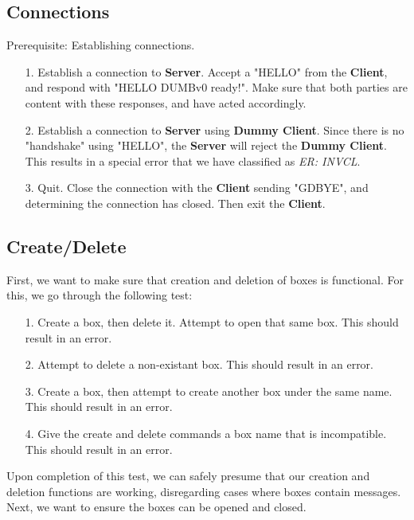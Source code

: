\documentclass{article}
\begin{document}
        \subsection{Connections}
            Prerequisite: Establishing connections.
            \begin{itemize}
                \item[1.] Establish a connection to \textbf{Server}. Accept a "HELLO" from the \textbf{Client}, and respond with "HELLO DUMBv0 ready!". Make sure that both parties are content with these responses, and have acted accordingly.
                \item[2.] Establish a connection to \textbf{Server} using \textbf{Dummy Client}. Since there is no "handshake" using "HELLO", the \textbf{Server} will reject the \textbf{Dummy Client}. This results in a special error that we have classified as \textit{ER: INVCL}.
                \item[3.] Quit. Close the connection with the \textbf{Client} sending "GDBYE", and determining the connection has closed. Then exit the \textbf{Client}.
            \end{itemize}
        \subsection{Create/Delete}
            First, we want to make sure that creation and deletion of boxes is functional. For this, we go through the following test:
            \begin{itemize}
                \item[1.] Create a box, then delete it. Attempt to open that same box. This should result in an error.
                \item[2.] Attempt to delete a non-existant box. This should result in an error.
                \item[3.] Create a box, then attempt to create another box under the same name. This should result in an error.
                \item[4.] Give the create and delete commands a box name that is incompatible. This should result in an error.   
            \end{itemize}
            Upon completion of this test, we can safely presume that our creation and deletion functions are working, disregarding cases where boxes contain messages. Next, we want to ensure the boxes can be opened and closed. 
\end{document}
